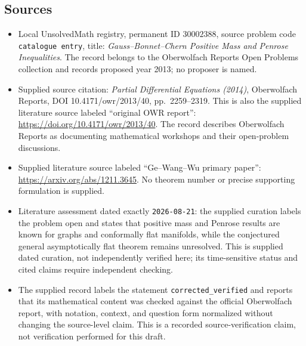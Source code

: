 \documentclass[11pt]{article}
\begin{document}
\subsection{Sources}
\begin{itemize}
\item Local UnsolvedMath registry, permanent ID \(30002388\), source problem code \texttt{catalogue entry}, title: \emph{Gauss--Bonnet--Chern Positive Mass and Penrose Inequalities}. The record belongs to the Oberwolfach Reports Open Problems collection and records proposed year 2013; no proposer is named.
\item Supplied source citation: \emph{Partial Differential Equations (2014)}, Oberwolfach Reports, DOI 10.4171/owr/2013/40, pp.\ 2259--2319. This is also the supplied literature source labeled ``original OWR report'': \url{https://doi.org/10.4171/owr/2013/40}. The record describes Oberwolfach Reports as documenting mathematical workshops and their open-problem discussions.
\item Supplied literature source labeled ``Ge--Wang--Wu primary paper'': \url{https://arxiv.org/abs/1211.3645}. No theorem number or precise supporting formulation is supplied.
\item Literature assessment dated exactly \texttt{2026-08-21}: the supplied curation labels the problem open and states that positive mass and Penrose results are known for graphs and conformally flat manifolds, while the conjectured general asymptotically flat theorem remains unresolved. This is supplied dated curation, not independently verified here; its time-sensitive status and cited claims require independent checking.
\item The supplied record labels the statement \texttt{corrected\_verified} and reports that its mathematical content was checked against the official Oberwolfach report, with notation, context, and question form normalized without changing the source-level claim. This is a recorded source-verification claim, not verification performed for this draft.
\end{itemize}
\end{document}
